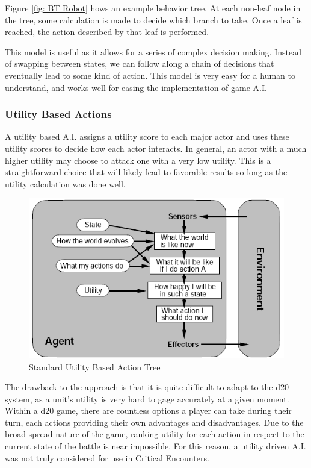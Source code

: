 \documentclass[12pt,a4paper]{report}
\begin{document}
		Figure \ref{fig: BT Robot} hows an example behavior tree. At each non-leaf node in the tree, some calculation is made to decide which branch to take. Once a leaf is reached, the action described by that leaf is performed. 
		
		This model is useful as it allows for a series of complex decision making. Instead of swapping between states, we can follow along a chain of decisions that eventually lead to some kind of action. This model is very easy for a human to understand, and works well for easing the implementation of game A.I. 
		\newpage
		\subsubsection{Utility Based Actions}
		A utility based A.I. assigns a utility score to each major actor and uses these utility scores to decide how each actor interacts. In general, an actor with a much higher utility may choose to attack one with a very low utility. This is a straightforward choice that will likely lead to favorable results so long as the utility calculation was done well. 
		
		\begin{figure}[H]
			\centering
			\includegraphics[scale=.65]{utility}
			\caption{Standard Utility Based Action Tree}
			\label{fig: Utility Based Actions}
		\end{figure}
		The drawback to the approach is that it is quite difficult to adapt to the d20 system, as a unit's utility is very hard to gage accurately at a given moment. Within a d20 game, there are countless options a player can take during their turn, each actions providing their own advantages and disadvantages. Due to the broad-spread nature of the game, ranking utility for each action in respect to the current state of the battle is near impossible. For this reason, a utility driven A.I. was not truly considered for use in Critical Encounters. 
		\newpage
\end{document}
